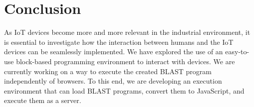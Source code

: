 \documentclass[runningheads]{llncs}
\begin{document}
\section{Conclusion}

As IoT devices become more and more relevant in the industrial environment, it is essential to investigate how the interaction between humans and the IoT devices can be seamlessly implemented.
We have explored the use of an easy-to-use block-based programming environment to interact with devices.
We are currently working on a way to execute the created BLAST program independently of browsers.
To this end, we are developing an execution environment that can load BLAST programs, convert them to JavaScript, and execute them as a server.

%
%
%


%
\end{document}
